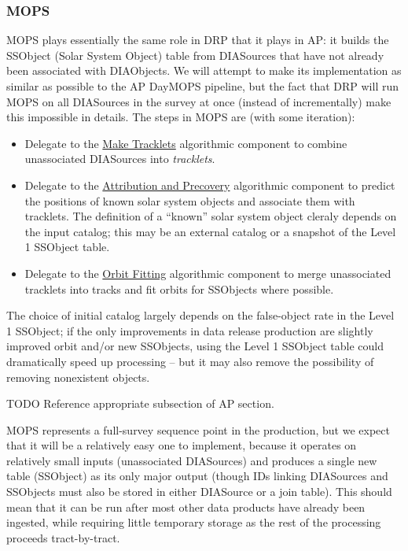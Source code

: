 \subsubsection{MOPS}
\label{sec:drpMOPS}

MOPS plays essentially the same role in DRP that it plays in AP: it builds the SSObject (Solar System Object) table from DIASources that have not already been associated with DIAObjects.  We will attempt to make its implementation as similar as possible to the AP DayMOPS pipeline, but the fact that DRP will run MOPS on all DIASources in the survey at once (instead of incrementally) make this impossible in details.  The steps in MOPS are (with some iteration):

\begin{itemize}
\item Delegate to the \hyperref[sec:acMakeTracklets]{Make Tracklets} algorithmic component to combine unassociated DIASources into \emph{tracklets}.
\item Delegate to the \hyperref[sec:acAttributionAndPrecovery]{Attribution and Precovery} algorithmic component to predict the positions of known solar system objects and associate them with tracklets.  The definition of a ``known'' solar system object cleraly depends on the input catalog; this may be an external catalog or a snapshot of the Level 1 SSObject table.
\item Delegate to the \hyperref[sec:acOrbitFitting]{Orbit Fitting} algorithmic component to merge unassociated tracklets into tracks and fit orbits for SSObjects where possible.
\end{itemize}

The choice of initial catalog largely depends on the false-object rate in the Level 1 SSObject; if the only improvements in data release production are slightly improved orbit and/or new SSObjects, using the Level 1 SSObject table could dramatically speed up processing -- but it may also remove the possibility of removing nonexistent objects.

\begin{note}{TODO}
Reference appropriate subsection of AP section.
\end{note}

MOPS represents a full-survey sequence point in the production, but we expect that it will be a relatively easy one to implement, because it operates on relatively small inputs (unassociated DIASources) and produces a single new table (SSObject) as its only major output (though IDs linking DIASources and SSObjects must also be stored in either DIASource or a join table).  This should mean that it can be run after most other data products have already been ingested, while requiring little temporary storage as the rest of the processing proceeds tract-by-tract.

